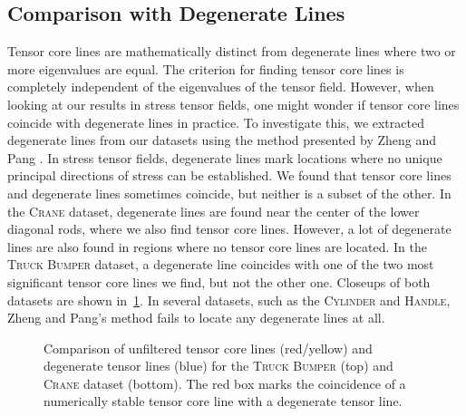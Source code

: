 \subsection{Comparison with Degenerate Lines} %
\label{sub:comparison_with_degenerate_lines}
%
Tensor core lines are mathematically distinct from degenerate lines where two or
more eigenvalues are equal.
%
The criterion for finding tensor core lines is completely independent of the
eigenvalues of the tensor field.
%
However, when looking at our results in stress tensor fields, one might wonder
if tensor core lines coincide with degenerate lines in practice.
%
To investigate this, we extracted degenerate lines from our datasets using the
method presented by Zheng and Pang \cite{Zheng2004}.
%
In stress tensor fields, degenerate lines mark locations where no unique
principal directions of stress can be established.
%
We found that tensor core lines and degenerate lines sometimes coincide, but
neither is a subset of the other.
%
In the \textsc{Crane} dataset, degenerate lines are found near the center of the
lower diagonal rods, where we also find tensor core lines.
%
However, a lot of degenerate lines are also found in regions where no tensor
core lines are located.
%
In the \textsc{Truck Bumper} dataset, a degenerate line coincides with one of
the two most significant tensor core lines we find, but not the other one.
%
Closeups of both datasets are shown in~\cref{fig:topo_comparison}.
%
In several datasets, such as the \textsc{Cylinder} and \textsc{Handle}, Zheng
and Pang's method fails to locate any degenerate lines at all.
%
\begin{figure}[p]
    \begin{captionbeside}{Comparison of unfiltered tensor core lines
    (red/yellow) and degenerate tensor lines (blue) for the \textsc{Truck
    Bumper} (top) and \textsc{Crane} dataset (bottom). The red box marks the
    coincidence of a numerically stable tensor core line with a degenerate
    tensor line.\label{fig:topo_comparison}}
        \setlength{\figurewidth}{0.7\textwidth}
        
    \end{captionbeside}
\end{figure}
%
%
